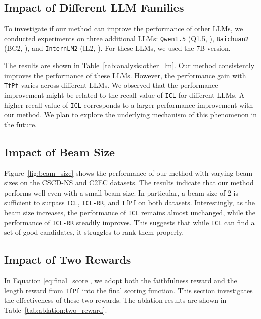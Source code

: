 \subsection{Impact of Different LLM Families}
\label{app:other_llm}

To investigate if our method can improve the performance of other LLMs, we conducted experiments on three additional LLMs: \texttt{Qwen1.5} (Q1.5, \citet{bai-etal-2023-qwen}), \texttt{Baichuan2} (BC2, \citet{yang-etal-2023-baichuan}), and \texttt{InternLM2} (IL2, \citet{cai-etal-2024-internlm2}).
For these LLMs, we used the 7B version.

The results are shown in Table~\ref{tab:analysis:other_lm}.
Our method consistently improves the performance of these LLMs.
However, the performance gain with \texttt{TfPf} varies across different LLMs.
We observed that the performance improvement might be related to the recall value of \texttt{ICL} for different LLMs.
A higher recall value of \texttt{ICL} corresponds to a larger performance improvement with our method.
We plan to explore the underlying mechanism of this phenomenon in the future.

\subsection{Impact of Beam Size}
\label{app:beam_size}

Figure~\ref{fig:beam_size} shows the performance of our method with varying beam sizes on the CSCD-NS and C2EC datasets.
The results indicate that our method performs well even with a small beam size.
In particular, a beam size of 2 is sufficient to surpass \texttt{ICL}, \texttt{ICL-RR}, and \texttt{TfPf} on both datasets.
Interestingly, as the beam size increases, the performance of \texttt{ICL} remains almost unchanged, while the performance of \texttt{ICL-RR} steadily improves.
This suggests that while \texttt{ICL} can find a set of good candidates, it struggles to rank them properly.

\subsection{Impact of Two Rewards}
\label{app:ablation:two_reward}


In Equation \ref{eq:final_score}, we adopt both the faithfulness reward and the length reward from \texttt{TfPf} into the final scoring function.
This section investigates the effectiveness of these two rewards.
The ablation results are shown in Table~\ref{tab:ablation:two_reward}.

